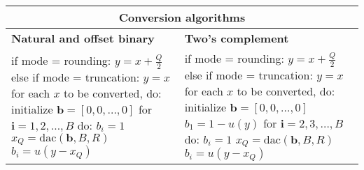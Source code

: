 \begin{center}
\begin{tabular}{|p{}|p{}|}
\hline
	\multicolumn{2}{|c|}{\textbf{Conversion algorithms}}\\
	\hline
	\textbf{Natural and offset binary}
		& \textbf{Two's complement}\\
	\hline
	if mode = rounding:\newline
		\hspace*{0.5cm} $y = x + \frac{Q}{2}$\newline
	else if mode = truncation:\newline
		\hspace*{0.5cm} $y = x$\newline
	for each $x$ to be converted, do:\newline
		\hspace*{0.5cm} initialize $\mathbf{b}=[0,0,\dots ,0]$\newline
		\hspace*{0.5cm} for $\mathbf{i}=1,2,\dots , B$ do:\newline
		\hspace*{1cm}$b_i = 1$\newline
		\hspace*{1cm}$x_Q = \text{dac}(\mathbf{b}, B, R)$\newline
		\hspace*{1cm}$b_i = u(y-x_Q)$
		& if mode = rounding: \newline
		\hspace*{0.5cm} $y = x + \frac{Q}{2}$ \newline
		else if mode = truncation: \newline
		\hspace*{0.5cm} $y = x$ \newline
		for each $x$ to be converted, do:\newline
		\hspace*{0.5cm} initialize $\mathbf{b}=[0,0,\dots ,0]$\newline
		\hspace*{0.5cm} $b_1 = 1- u(y)$ \newline
		\hspace*{0.5cm} for $\mathbf{i}=2,3,\dots , B$ do:\newline
		\hspace*{1cm}$b_i = 1$\newline
		\hspace*{1cm}$x_Q = \text{dac}(\mathbf{b}, B, R)$\newline
		\hspace*{1cm}$b_i = u(y-x_Q)$\\
	\hline
\end{tabular}
\end{center}

